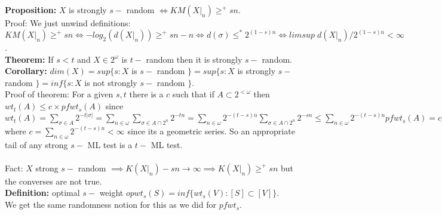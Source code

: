 \documentclass{article}
\begin{document}
  \textbf{Proposition:} $X$ is strongly $s-$ random $\iff KM(X|_n) \geq^+ sn$.
  \\Proof: We just unwind definitions:\\ $KM(X|_n) \geq^+ sn \iff -log_2(d(X|_n)) \geq^+ sn-n \iff d(\sigma) \leq^* 2^{(1-s)n} \iff limsup \;d(X|_n)/2^{(1-s)n}< \infty$.\\
  \textbf{Theorem:} If $s< t$ and $X \in 2^\omega$ is $t-$ random then it is strongly $s- $ random.
  \\ \textbf{Corollary:} $dim(X) = sup\{s : X $ is $s-$ random $\} = sup \{s: X$ is strongly $s-$ random $\} = inf \{s : X$ is not strongly $s-$ random $\}$.\\
  Proof of theorem: For a given $s,t$ there is a $c$ such that if $A \subset 2^{<\omega}$ then $wt_t(A) \leq c \times pfwt_s(A)$ since $wt_t(A)  = \sum_{\sigma \in A} 2^{-t |\sigma| } = \sum_{n \in \omega} \sum_{\sigma \in A\cap 2^n} 2^{-tn} = \sum_{n \in \omega} 2^{-(t-s)n}\sum_{\sigma \in A \cap 2^n} 2^{-sn} \leq \sum_{n \in \omega} 2^{-(t-s)n} pfwt_s(A) = c pfwt_s(A)$ where $c = \sum_{n \in \omega} 2^{-(t-s)n} < \infty$ since its a geometric series. So an appropriate tail of any strong $s-$ ML test is a $t-$ ML test.\\\\
  Fact: $X $ strong $s-$ random $\implies K(X|_n) - sn \to \infty  \implies K(X|_n ) \geq^+ sn$ but the converses are not true. \\
  \textbf{Definition:} optimal $s-$ weight $opwt_s(S) = inf \{wt_s(V) : [S]\subset [V]\}$.\\
  We get the same randomness notion for this as we did for $pfwt_s$.
  \newpage
\end{document}
